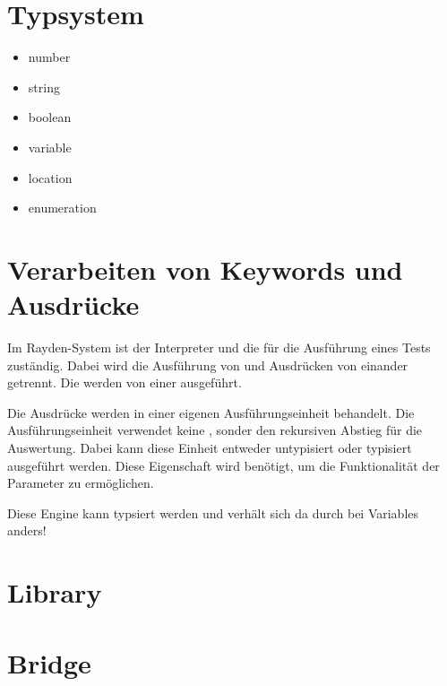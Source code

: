 \section{Typsystem}

\begin{itemize}
\item number
\item string
\item boolean
\item variable
\item location
\item enumeration
\end{itemize}

\todo

\section{Verarbeiten von Keywords und Ausdrücke}

Im Rayden-System ist der Interpreter und die  für die Ausführung eines Tests zuständig. Dabei wird die Ausführung von  und Ausdrücken von einander getrennt. Die  werden von einer  ausgeführt. 

\SuperPar
Die Ausdrücke werden in einer eigenen Ausführungseinheit behandelt. Die Ausführungseinheit verwendet keine , sonder den rekursiven Abstieg für die Auswertung. Dabei kann diese Einheit entweder untypisiert oder typisiert ausgeführt werden. Diese Eigenschaft wird benötigt, um die Funktionalität der Parameter zu ermöglichen. 

\SuperPar

Diese Engine kann typsiert werden und verhält sich da durch bei Variables anders!
\todo

\section{Library}

\todo

\section{Bridge}

